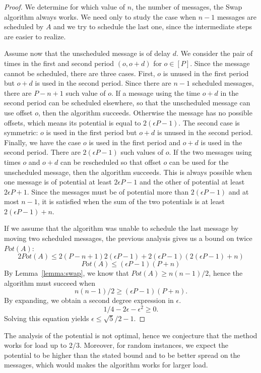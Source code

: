 \documentclass[10pt, conference, letterpaper]{IEEEtran}
\begin{document}
\begin{proof}
We determine for which value of $n$, the number of messages, the Swap algorithm
always works. We need only to study the case when $n-1$ messages are scheduled by $A$
and we try to schedule the last one, since the intermediate steps are easier to realize. 

Assume now that the unscheduled message is of delay $d$. We consider the pair 
of times in the first and second period $(o,o+d)$ for $o \in [P]$. Since the message
cannot be scheduled, there are three cases. First, $o$ is unused in the first period but $o+d$ is used in the second period. Since there are $n-1$ scheduled messages, there are $P-n+1$ such value of $o$. If a message using the time $o+d$ in the second period can be scheduled elsewhere, so that the unscheduled message can use offset $o$, then the algorithm succeeds.
Otherwise the message has no possible offsets, which means its potential is equal to $2(\epsilon P -1)$.
The second case is symmetric: $o$ is used in the first period but $o+d$ is unused in the second period. 
Finally, we have the case $o$ is used in the first period and $o+d$ is used in the second period.  There are $2(\epsilon P -1)$ such values of $o$. If the two messages using times 
$o$ and $o+d$ can be rescheduled so that offset $o$ can be used for the unscheduled message,
then the algorithm succeeds. This is always possible when one message is of potential at least $2\epsilon P -1$ and the other of potential at least $2\epsilon P + 1$. Since the messages must be of potential more than $2(\epsilon P -1)$ and at most $n-1$, it is satisfied when the sum of the two potentials is at least $2(\epsilon P -1) + n$.

If we assume that the algorithm was unable to schedule the last message by moving two scheduled messages, the previous analysis gives us a bound on twice $Pot(A)$: 
$$ 2Pot(A) \leq 2(P-n+1) 2(\epsilon P -1) + 2(\epsilon P -1)(2(\epsilon P -1) + n) $$
$$ Pot(A) \leq (\epsilon P -1) (P + n)$$
By Lemma~\ref{lemma:swap}, we know that $Pot(A) \geq n(n-1)/2$, hence 
the algorithm must succeed when
$$n(n-1)/2 \geq  (\epsilon P -1) (P + n).$$
By expanding, we obtain a second degree expression in $\epsilon$.
$$1/4 - 2\epsilon - \epsilon ^2 \geq  0.$$
Solving this equation yields $\epsilon \leq \sqrt{5}/2 -1$.
\end{proof}

The analysis of the potential is not optimal, hence we conjecture that the method works
for load up to $2/3$. Moreover, for random instances, we expect the potential to be higher 
than the stated bound and to be better spread on the messages, which would makes the algorithm
works for larger load.
\end{document}

